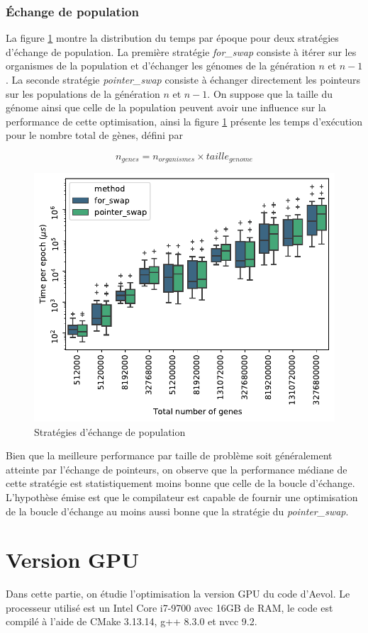 \documentclass[a4paper, 10pt, twoside]{article}
\begin{document}
\subsubsection{Échange de population}

La figure \ref{fig:swap/strat} montre la distribution du temps par époque pour deux stratégies d'échange de population.
La première stratégie \textit{for\_swap} consiste à itérer sur les organismes de la population et d'échanger les génomes de la génération $n$ et $n-1$.
La seconde stratégie \textit{pointer\_swap} consiste à échanger directement les pointeurs sur les populations de la génération $n$ et $n-1$.
On suppose que la taille du génome ainsi que celle de la population peuvent avoir une influence sur la performance de cette optimisation, ainsi la figure \ref{fig:swap/strat} présente les temps d'exécution pour le nombre total de gènes, défini par

$$ n_{genes} = n_{organismes} \times taille_{genome} $$

\begin{figure}[htb]
	\centering
	\includegraphics[width=0.5\linewidth]{img/swap_strategies.pdf}
	\caption{Stratégies d'échange de population}
	\label{fig:swap/strat}
\end{figure}

Bien que la meilleure performance par taille de problème soit généralement atteinte par l'échange de pointeurs, on observe que la performance médiane de cette stratégie est statistiquement moins bonne que celle de la boucle d'échange.
L'hypothèse émise est que le compilateur est capable de fournir une optimisation de la boucle d'échange au moins aussi bonne que la stratégie du \textit{pointer\_swap}.

\section{Version GPU}

Dans cette partie, on étudie l'optimisation la version GPU du code d'Aevol. Le processeur utilisé est un Intel Core i7-9700 avec 16GB de RAM, le code est compilé à l'aide de CMake 3.13.14, g++ 8.3.0 et nvcc 9.2.
\end{document}
